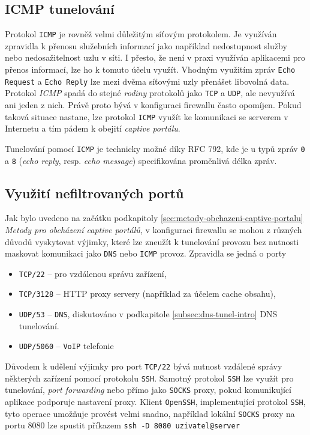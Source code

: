 \documentclass[thesis=M,czech]{FITthesis}[2012/10/20]
\begin{document}
\subsection{ICMP tunelování}

Protokol \texttt{ICMP} je rovněž velmi důležitým síťovým protokolem. Je využíván zpravidla k přenosu služebních informací jako například nedostupnost služby nebo nedosažitelnost uzlu v síti. I přesto, že není v praxi využíván aplikacemi pro přenos informací, lze ho k tomuto účelu využít. Vhodným využitím zpráv \texttt{Echo Request} a \texttt{Echo Reply} lze mezi dvěma síťovými uzly přenášet libovolná data. Protokol \textit{ICMP} spadá do stejné \textit{rodiny} protokolů jako \texttt{TCP} a \texttt{UDP}, ale nevyužívá ani jeden z nich. Právě proto bývá v konfiguraci firewallu často opomíjen. Pokud taková situace nastane, lze protokol \texttt{ICMP} využít ke komunikaci se serverem v Internetu a tím pádem k obejití \textit{captive portálu}.

Tunelování pomocí \texttt{ICMP} je technicky možné díky RFC 792\cite{rfc792}, kde je u typů zpráv \texttt{0} a \texttt{8} (\textit{echo reply}, resp. \textit{echo message}) specifikována proměnlivá délka zpráv.

\subsection{Využití nefiltrovaných portů}
\label{subsec:nonfiltered-ports}
Jak bylo uvedeno na začátku podkapitoly \ref{sec:metody-obchazeni-captive-portalu} \textit{Metody pro obcházení captive portálů}, v konfiguraci firewallu se mohou z různých důvodů vyskytovat výjimky, které lze zneužít k tunelování provozu bez nutnosti maskovat komunikaci jako \texttt{DNS} nebo \texttt{ICMP} provoz. Zpravidla\cite{defcon-captive-article} se jedná o porty 

\begin{itemize}
 \item \texttt{TCP/22} -- pro vzdálenou správu zařízení,
 \item \texttt{TCP/3128} -- HTTP proxy servery (například za účelem cache obsahu),
 \item \texttt{UDP/53} -- \texttt{DNS}, diskutováno v podkapitole \ref{subsec:dns-tunel-intro} DNS tunelování.
 \item \texttt{UDP/5060} -- \texttt{VoIP} telefonie
\end{itemize}

Důvodem k udělení výjimky pro port \texttt{TCP/22} bývá nutnost vzdálené správy některých zařízení pomocí protokolu \texttt{SSH}. Samotný protokol \texttt{SSH} lze využít pro tunelování, \textit{port forwarding} nebo přímo jako \texttt{SOCKS} proxy, pokud komunikující aplikace podporuje nastavení proxy. Klient \texttt{OpenSSH}, implementující protokol \texttt{SSH}, tyto operace umožňuje provést velmi snadno, například lokální \texttt{SOCKS} proxy na portu 8080 lze spustit příkazem \texttt{ssh -D 8080 uzivatel@server}
\end{document}
